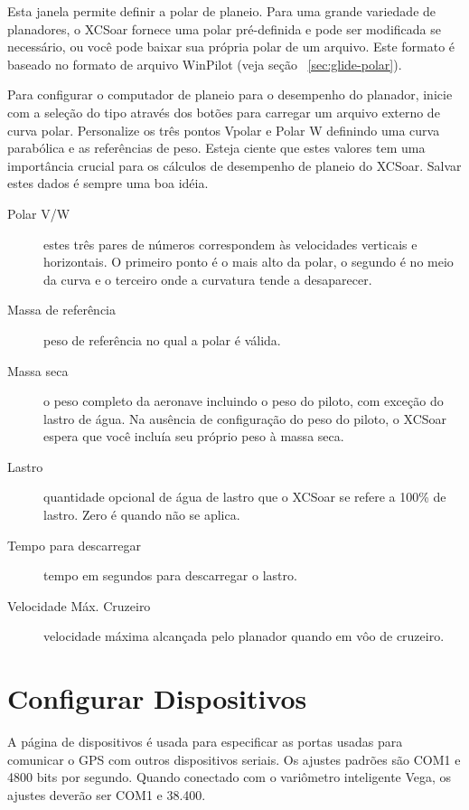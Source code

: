 Esta janela permite definir a polar de planeio.  Para uma grande variedade 
de planadores, o XCSoar fornece uma polar pré-definida e pode ser modificada se necessário, ou você pode baixar sua própria polar de um arquivo.  Este formato é baseado no formato de arquivo WinPilot (veja seção ~\ref{sec:glide-polar}).

\label{conf:polar} Para configurar o computador de planeio para o desempenho do planador, inicie com a seleção do tipo através dos botões     para carregar um arquivo externo de curva polar.
Personalize os três pontos Vpolar e Polar W definindo uma curva parabólica e as referências de peso.  Esteja ciente que estes valores tem uma importância crucial para os cálculos de desempenho de planeio do XCSoar.  \tip Salvar estes dados é sempre uma boa idéia.

\begin{description}
\item[Polar V/W]  estes três pares de números correspondem às velocidades verticais e horizontais.  O primeiro ponto é o mais alto da polar, o segundo é no meio da curva e o terceiro onde a curvatura tende a desaparecer.
\item[Massa de referência]  peso de referência no qual a polar é válida.
\item[Massa seca]  o peso completo da aeronave incluindo o peso do piloto, com exceção do lastro de água.  Na ausência de configuração do peso do piloto, o XCSoar espera que você incluía seu próprio peso à massa seca.
\item[Lastro] quantidade opcional de água de lastro que o XCSoar se refere a 100\% de lastro.  Zero é quando não se aplica.
\item[Tempo para descarregar]  tempo em segundos para descarregar o lastro.
\item[Velocidade Máx. Cruzeiro] velocidade máxima alcançada pelo planador quando em vôo de cruzeiro.
\end{description}


\section{Configurar Dispositivos} \label{conf:comdevices}

A página de dispositivos é usada para especificar as portas usadas para 
comunicar o GPS com outros dispositivos seriais.  Os ajustes padrões são COM1 e 4800 bits por segundo.  Quando conectado com o variômetro inteligente Vega, os ajustes deverão ser COM1 e 38.400.

